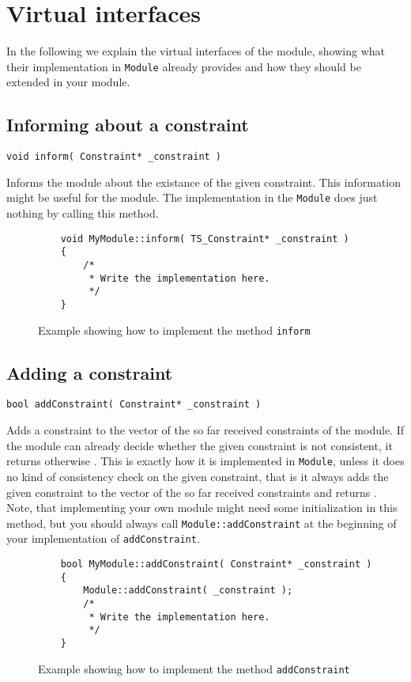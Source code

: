 \section{Virtual interfaces}
In the following we explain the virtual interfaces
of the module, showing what their implementation in \texttt{Module} already
provides and how they should be extended in your module.

\subsection{Informing about a constraint}
\begin{verbatim}void inform( Constraint* _constraint )\end{verbatim}
Informs the module about the existance of the given constraint. This information might
be useful for the module. The implementation in the \texttt{Module} does just nothing by calling
this method.

\begin{figure}[htb]
\label{fig:exa_inform}
\caption{Example showing how to implement the method \texttt{inform}}
\begin{verbatim}
	void MyModule::inform( TS_Constraint* _constraint )
	{
	    /*
	     * Write the implementation here.
	     */
	}
\end{verbatim}
\end{figure}

\subsection{Adding a constraint}
\begin{verbatim}bool addConstraint( Constraint* _constraint )\end{verbatim}
Adds a constraint to the vector of the so far received constraints of the module. If the module
can already decide whether the given constraint is not consistent, it returns \false
otherwise \true. This is exactly how it is implemented in \texttt{Module}, unless
it does no kind of consistency check on the given constraint, that is it always adds the
given constraint to the vector of the so far received constraints and returns \true.
Note, that implementing your own module might need some initialization in this method,
but you should always call \texttt{Module::addConstraint} at the beginning of your
implementation of \texttt{addConstraint}.

\begin{figure}[htb]
\label{fig:exa_addconstraint}
\caption{Example showing how to implement the method \texttt{addConstraint}}
\begin{verbatim}
	bool MyModule::addConstraint( Constraint* _constraint )
	{
	    Module::addConstraint( _constraint );
	    /*
	     * Write the implementation here.
	     */
	}
\end{verbatim}
\end{figure}

